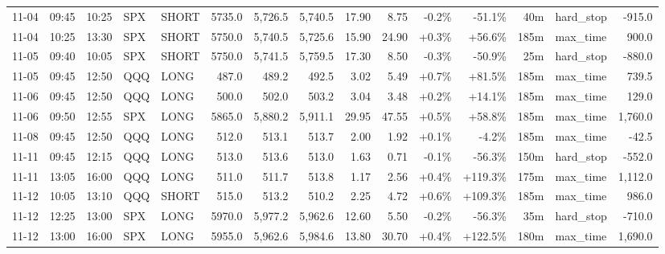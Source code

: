 \documentclass[11pt,a4paper,twoside]{article}
\begin{document}
\begin{landscape}
\begin{center}
\begin{longtable}{>{\color{txtmain}}l l l l l r r r r r r r r >{\color{txtmain}}l r}
11-04 & 09:45 & 10:25 & SPX & SHORT & 5735.0 & 5,726.5 & 5,740.5 & 17.90 & 8.75 & \textcolor{lossred}{-0.2\%} & \textcolor{lossred}{-51.1\%} & 40m & hard\_stop & \textcolor{lossred}{-915.0} \\
11-04 & 10:25 & 13:30 & SPX & SHORT & 5750.0 & 5,740.5 & 5,725.6 & 15.90 & 24.90 & \textcolor{wingreen}{+0.3\%} & \textcolor{wingreen}{+56.6\%} & 185m & max\_time & \textcolor{wingreen}{900.0} \\
11-05 & 09:40 & 10:05 & SPX & SHORT & 5750.0 & 5,741.5 & 5,759.5 & 17.30 & 8.50 & \textcolor{lossred}{-0.3\%} & \textcolor{lossred}{-50.9\%} & 25m & hard\_stop & \textcolor{lossred}{-880.0} \\
11-05 & 09:45 & 12:50 & QQQ & LONG & 487.0 & 489.2 & 492.5 & 3.02 & 5.49 & \textcolor{wingreen}{+0.7\%} & \textcolor{wingreen}{+81.5\%} & 185m & max\_time & \textcolor{wingreen}{739.5} \\
11-06 & 09:45 & 12:50 & QQQ & LONG & 500.0 & 502.0 & 503.2 & 3.04 & 3.48 & \textcolor{wingreen}{+0.2\%} & \textcolor{wingreen}{+14.1\%} & 185m & max\_time & \textcolor{wingreen}{129.0} \\
11-06 & 09:50 & 12:55 & SPX & LONG & 5865.0 & 5,880.2 & 5,911.1 & 29.95 & 47.55 & \textcolor{wingreen}{+0.5\%} & \textcolor{wingreen}{+58.8\%} & 185m & max\_time & \textcolor{wingreen}{1,760.0} \\
11-08 & 09:45 & 12:50 & QQQ & LONG & 512.0 & 513.1 & 513.7 & 2.00 & 1.92 & \textcolor{wingreen}{+0.1\%} & \textcolor{lossred}{-4.2\%} & 185m & max\_time & \textcolor{lossred}{-42.5} \\
11-11 & 09:45 & 12:15 & QQQ & LONG & 513.0 & 513.6 & 513.0 & 1.63 & 0.71 & \textcolor{lossred}{-0.1\%} & \textcolor{lossred}{-56.3\%} & 150m & hard\_stop & \textcolor{lossred}{-552.0} \\
11-11 & 13:05 & 16:00 & QQQ & LONG & 511.0 & 511.7 & 513.8 & 1.17 & 2.56 & \textcolor{wingreen}{+0.4\%} & \textcolor{wingreen}{+119.3\%} & 175m & max\_time & \textcolor{wingreen}{1,112.0} \\
11-12 & 10:05 & 13:10 & QQQ & SHORT & 515.0 & 513.2 & 510.2 & 2.25 & 4.72 & \textcolor{wingreen}{+0.6\%} & \textcolor{wingreen}{+109.3\%} & 185m & max\_time & \textcolor{wingreen}{986.0} \\
11-12 & 12:25 & 13:00 & SPX & LONG & 5970.0 & 5,977.2 & 5,962.6 & 12.60 & 5.50 & \textcolor{lossred}{-0.2\%} & \textcolor{lossred}{-56.3\%} & 35m & hard\_stop & \textcolor{lossred}{-710.0} \\
11-12 & 13:00 & 16:00 & SPX & LONG & 5955.0 & 5,962.6 & 5,984.6 & 13.80 & 30.70 & \textcolor{wingreen}{+0.4\%} & \textcolor{wingreen}{+122.5\%} & 180m & max\_time & \textcolor{wingreen}{1,690.0} \\

\end{longtable}
\end{center}
\end{landscape}
\end{document}
